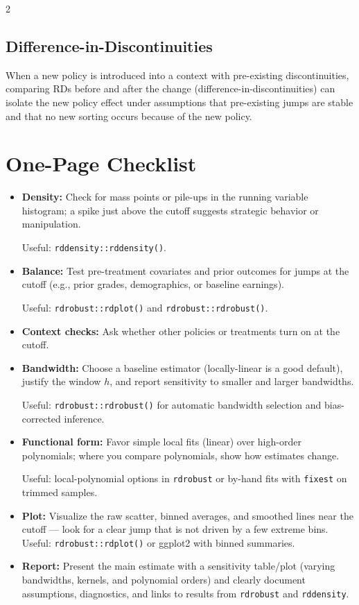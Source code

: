 \documentclass[12pt]{article}
\begin{document}
\begin{multicols}{2}
\subsection*{Difference-in-Discontinuities}
When a new policy is introduced into a context with pre-existing discontinuities, comparing RDs before and after the change (difference-in-discontinuities) can isolate the new policy effect under assumptions that pre-existing jumps are stable and that no new sorting occurs because of the new policy.

\end{multicols}

\section*{One-Page Checklist}
\begin{itemize}
  \item \textbf{Density:} Check for mass points or pile-ups in the running variable histogram; a spike just above the cutoff suggests strategic behavior or manipulation.
  
  Useful: \texttt{rddensity::rddensity()}.

  \item \textbf{Balance:} Test pre-treatment covariates and prior outcomes for jumps at the cutoff (e.g., prior grades, demographics, or baseline earnings).
  
  Useful: \texttt{rdrobust::rdplot()} and \texttt{rdrobust::rdrobust()}.

  \item \textbf{Context checks:} Ask whether other policies or treatments turn on at the cutoff.
  
  \item \textbf{Bandwidth:} Choose a baseline estimator (locally-linear is a good default), justify the window $h$, and report sensitivity to smaller and larger bandwidths.

  Useful: \texttt{rdrobust::rdrobust()} for automatic bandwidth selection and bias-corrected inference.
  
  \item \textbf{Functional form:} Favor simple local fits (linear) over high-order polynomials; where you compare polynomials, show how estimates change.

  Useful: local-polynomial options in \texttt{rdrobust} or by-hand fits with \texttt{fixest} on trimmed samples.

  \item \textbf{Plot:} Visualize the raw scatter, binned averages, and smoothed lines near the cutoff — look for a clear jump that is not driven by a few extreme bins.
  Useful: \texttt{rdrobust::rdplot()} or ggplot2 with binned summaries.
  
  \item \textbf{Report:} Present the main estimate with a sensitivity table/plot (varying bandwidths, kernels, and polynomial orders) and clearly document assumptions, diagnostics, and links to results from \texttt{rdrobust} and \texttt{rddensity}.
\end{itemize}
\end{document}
